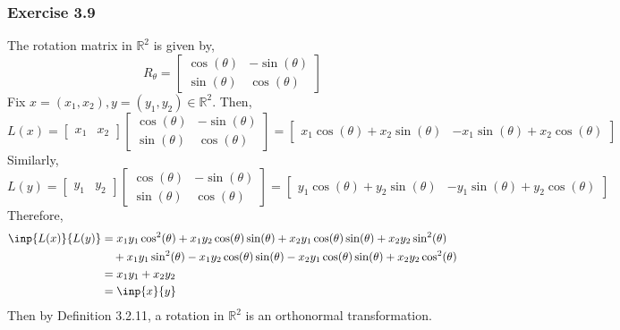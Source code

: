 \documentclass[letterpaper,12pt]{article}
\theoremstyle{definition}
\begin{document}
\subsubsection*{Exercise 3.9}
The rotation matrix in $\mathbb{R}^2$ is given by,
\begin{equation}
R_{\theta} = 
\begin{bmatrix}
	\cos(\theta) & -\sin(\theta) \\
	\sin(\theta) & \cos(\theta)
\end{bmatrix}
\end{equation}
Fix $x = (x_1, x_2), y= (y_1, y_2) \in \mathbb{R}^2$. Then,
\begin{equation}
	L(x) = 
	\begin{bmatrix}
	x_1 & x_2
	\end{bmatrix}
	\begin{bmatrix}
	\cos(\theta) & -\sin(\theta) \\
	\sin(\theta) & \cos(\theta)
	\end{bmatrix}
	= \begin{bmatrix}
	x_1 \cos(\theta) + x_2 \sin(\theta) & -x_1 \sin(\theta) + x_2\cos(\theta)
	\end{bmatrix}
\end{equation}
Similarly,
\begin{equation}
	L(y) = 
	\begin{bmatrix}
	y_1 & y_2
	\end{bmatrix}
	\begin{bmatrix}
	\cos(\theta) & -\sin(\theta) \\
	\sin(\theta) & \cos(\theta)
	\end{bmatrix}
	= \begin{bmatrix}
	y_1 \cos(\theta) + y_2 \sin(\theta) & -y_1 \sin(\theta) + y_2\cos(\theta)
	\end{bmatrix}
\end{equation}
Therefore, 
\begin{align*}
	\inp{L(x)}{L(y)} &= x_1y_1\cos^2(\theta) + x_1y_2 \cos(\theta)\sin(\theta)  + x_2y_1\cos(\theta)\sin(\theta) + x_2y_2 \sin^2(\theta) \\
	&\quad+ x_1y_1\sin^2(\theta) - x_1y_2\cos(\theta)\sin(\theta) - x_2y_1\cos(\theta)\sin(\theta) + x_2y_2 \cos^2(\theta) \\
	&= x_1y_1 + x_2y_2 \\
	&= \inp{x}{y}
\end{align*}
Then by Definition 3.2.11, a rotation in $\mathbb{R}^2$ is an orthonormal transformation.
\end{document}
